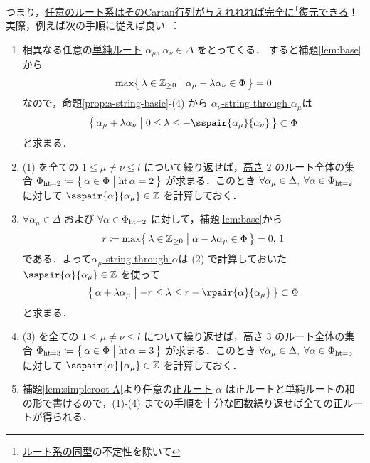 \documentclass[rep_main]{subfiles}
\begin{document}
つまり，\underline{任意の\hyperref[ax:root-system]{ルート系}はその\hyperref[def:Cartan-matrix]{Cartan行列}が与えれれれば完全に\footnote{\hyperref[def:isom-root]{ルート系の同型}の不定性を除いて}復元できる}！
実際，例えば次の手順に従えば良い~\cite[p.56]{Humphreys1972introduction}：
\begin{enumerate}
	\item 相異なる任意の\hyperref[def:base-root]{単純ルート} $\alpha_\mu,\, \alpha_\nu \in \Delta$ をとってくる．
	すると補題\ref{lem:base}から 
	\begin{align}
		\max \bigl\{\, \lambda \in \mathbb{Z}_{\ge 0} \bigm| \alpha_\mu - \lambda \alpha_\nu \in \Phi \,\bigr\} = 0
	\end{align}
	なので，命題\ref{prop:a-string-basic}-(4) から
	\hyperref[def:a-sting]{$\alpha_\nu$-string through $\alpha_\mu$}は
	\begin{align}
		\bigl\{\, \alpha_\mu + \lambda \alpha_\nu \bigm| 0 \le \lambda \le -\sspair{\alpha_\mu}{\alpha_\nu} \,\bigr\} \subset \Phi
	\end{align}
	と求まる．
	\item (1) を全ての $1 \le \mu \neq \nu \le l$ について繰り返せば，\hyperref[def:base-root]{高さ} $2$ のルート全体の集合 $\Phi_{\operatorname{ht} = 2} \coloneqq \bigl\{\, \alpha \in \Phi \bigm| \operatorname{ht} \alpha = 2\,\bigr\}$ が求まる．このとき $\forall \alpha_\mu \in \Delta,\; \forall \alpha \in \Phi_{\operatorname{ht} = 2}$ に対して $\sspair{\alpha}{\alpha_\mu} \in \mathbb{Z}$ を計算しておく．
	\item $\forall \alpha_\mu \in \Delta$ および $\forall \alpha \in \Phi_{\operatorname{ht} = 2}$ に対して，補題\ref{lem:base}から
	\begin{align}
		r \coloneqq \max \bigl\{\, \lambda \in \mathbb{Z}_{\ge 0} \bigm| \alpha - \lambda \alpha_\mu \in \Phi \,\bigr\} = 0,\, 1
	\end{align}
	である．よって\hyperref[def:a-sting]{$\alpha_\mu$-string through $\alpha$}は (2) で計算しておいた $\sspair{\alpha}{\alpha_\mu} \in \mathbb{Z}$ を使って
	\begin{align}
		\bigl\{\, \alpha + \lambda \alpha_\mu \bigm| -r \le \lambda \le r-\rpair{\alpha}{\alpha_\mu} \,\bigr\} \subset \Phi
	\end{align}
	と求まる．
	\item (3) を全ての $1 \le \mu \neq \nu \le l$ について繰り返せば，\hyperref[def:base-root]{高さ} $3$ のルート全体の集合 $\Phi_{\operatorname{ht} = 3} \coloneqq \bigl\{\, \alpha \in \Phi \bigm| \operatorname{ht} \alpha = 3\,\bigr\}$ が求まる．このとき $\forall \alpha_\mu \in \Delta,\; \forall \alpha \in \Phi_{\operatorname{ht} = 3}$ に対して $\sspair{\alpha}{\alpha_\mu} \in \mathbb{Z}$ を計算しておく．
	\item 補題\ref{lem:simpleroot-A}より任意の\hyperref[def:base-root]{正ルート} $\alpha$ は正ルートと単純ルートの和の形で書けるので，(1)-(4) までの手順を十分な回数繰り返せば全ての正ルートが得られる．
\end{enumerate}
\end{document}
